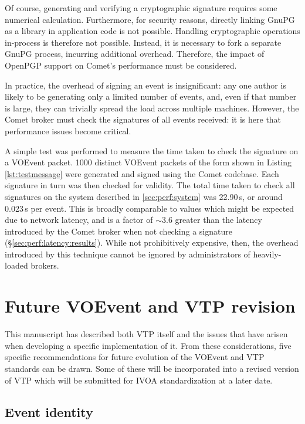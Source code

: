 \documentclass[5p,authoryear]{elsarticle}
\begin{document}
Of course, generating and verifying a cryptographic signature requires some
numerical calculation. Furthermore, for security reasons, directly linking
GnuPG as a library in application code is not possible. Handling cryptographic
operations in-process is therefore not possible. Instead, it is necessary to
fork a separate GnuPG process, incurring additional overhead. Therefore, the
impact of OpenPGP support on Comet's performance must be considered.

In practice, the overhead of signing an event is insignificant: any one author
is likely to be generating only a limited number of events, and, even if that
number is large, they can trivially spread the load across multiple machines.
However, the Comet broker must check the signatures of all events received: it
is here that performance issues become critical.

A simple test was performed to measure the time taken to check the signature
on a VOEvent packet. 1000 distinct VOEvent packets of the form shown in
Listing \ref{lst:testmessage} were generated and signed using the Comet
codebase. Each signature in turn was then checked for validity. The total
time taken to check all signatures on the system described in
\ref{sec:perf:system} was 22.90\,s, or around 0.023\,s per event. This is
broadly comparable to values which might be expected due to network latency,
and is a factor of $\sim3.6$ greater than the latency introduced by the Comet
broker when not checking a signature (\S\ref{sec:perf:latency:results}). While
not prohibitively expensive, then, the overhead introduced by this technique
cannot be ignored by administrators of heavily-loaded brokers.

\section{Future VOEvent and VTP revision}
\label{sec:futurevtp}

This manuscript has described both VTP itself and the issues that have arisen
when developing a specific implementation of it.  From these considerations,
five specific recommendations for future evolution of the VOEvent and VTP
standards can be drawn. Some of these will be incorporated into a revised
version of VTP which will be submitted for IVOA standardization at a later
date.

\subsection{Event identity}
\label{sec:future:identity}
\end{document}
